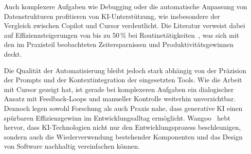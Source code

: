 Auch komplexere Aufgaben wie Debugging oder die automatische Anpassung von
Datenstrukturen profitieren von KI-Unterstützung, wie insbesondere der
Vergleich zwischen Copilot und Cursor verdeutlicht. Die Literatur verweist
dabei auf Effizienzsteigerungen von bis zu 50\,\% bei
Routinetätigkeiten~\cite{s_future_2024}, was sich mit den im Praxisteil
beobachteten Zeitersparnissen und Produktivitätsgewinnen deckt.

Die Qualität der Automatisierung bleibt jedoch stark abhängig von der Präzision
der Prompts und der Kontextintegration der eingesetzten Tools. Wie die Arbeit
mit Cursor gezeigt hat, ist gerade bei komplexeren Aufgaben ein dialogischer
Ansatz mit Feedback-Loops und manueller Kontrolle weiterhin unverzichtbar.
Dennoch legen sowohl Forschung als auch Praxis nahe, dass generative KI einen
spürbaren Effizienzgewinn im Entwicklungsalltag ermöglicht.
Wangoo~\cite{wangoo_artificial_2018} hebt hervor, dass KI-Technologien nicht
nur den Entwicklungsprozess beschleunigen, sondern auch die Wiederverwendung
bestehender Komponenten und das Design von Software nachhaltig vereinfachen
können.
